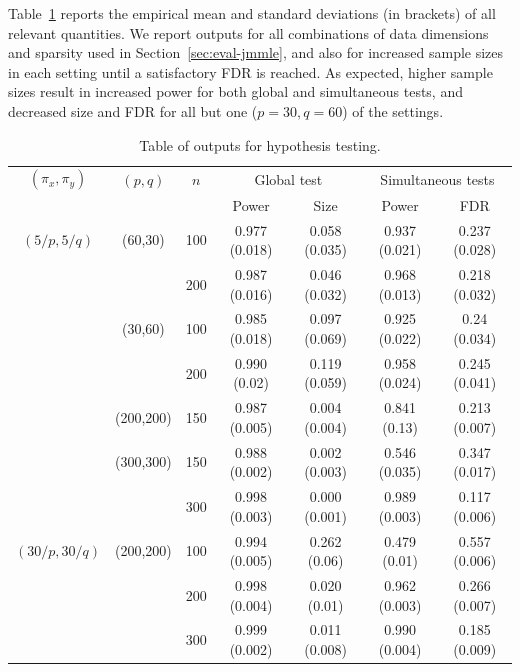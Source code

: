 Table~\ref{table:simtable3} reports the empirical mean and standard deviations (in brackets) of all relevant quantities. We report outputs for all combinations of data dimensions and sparsity used in Section~\ref{sec:eval-jmmle}, and also for increased sample sizes in each setting until a satisfactory FDR is reached. As expected, higher sample sizes result in increased power for both global and simultaneous tests, and decreased size and FDR for all but one ($p=30, q=60$) of the settings.

%
\begin{scriptsize}
\begin{table}
    \begin{tabular}{ccccccc}
    \hline
$(\pi_x, \pi_y)$ & $(p,q)$   & $n$ & \multicolumn{2}{c}{Global test} & \multicolumn{2}{c}{Simultaneous tests}\\\cline{4-7}
 & & & Power     & Size			   & Power         & FDR           \\ \hline
    $(5/p, 5/q)$ & (60,30)   & 100 & 0.977 (0.018) & 0.058 (0.035) & 0.937 (0.021) & 0.237 (0.028) \\
    ~            & ~         & 200 & 0.987 (0.016) & 0.046 (0.032) & 0.968 (0.013) & 0.218 (0.032) \\
    ~            & (30,60)   & 100 & 0.985 (0.018) & 0.097 (0.069) & 0.925 (0.022) & 0.24 (0.034)  \\
    ~            & ~         & 200 & 0.990 (0.02)  & 0.119 (0.059) & 0.958 (0.024) & 0.245 (0.041) \\
    ~            & (200,200) & 150 & 0.987 (0.005) & 0.004 (0.004) & 0.841 (0.13)  & 0.213 (0.007) \\
    ~            & (300,300) & 150 & 0.988 (0.002) & 0.002 (0.003) & 0.546 (0.035) & 0.347 (0.017) \\
    ~            & ~         & 300 & 0.998 (0.003) & 0.000 (0.001) & 0.989 (0.003) & 0.117 (0.006) \\ \hline
  $(30/p, 30/q)$ & (200,200) & 100 & 0.994 (0.005) & 0.262 (0.06)  & 0.479 (0.01)  & 0.557 (0.006) \\
    ~            & ~         & 200 & 0.998 (0.004) & 0.020 (0.01)  & 0.962 (0.003) & 0.266 (0.007) \\
    ~            & ~         & 300 & 0.999 (0.002) & 0.011 (0.008) & 0.990 (0.004) & 0.185 (0.009) \\ \hline
    \end{tabular}
    \caption{Table of outputs for hypothesis testing.}
    \label{table:simtable3}
\end{table}
\end{scriptsize}

